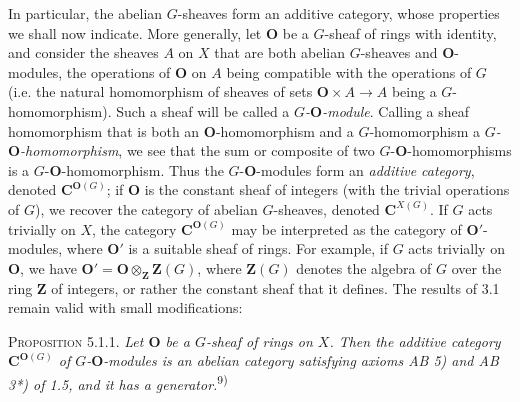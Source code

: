 \clearpage
{}

In particular, the abelian $G$-sheaves form an additive category, whose
properties we shall now indicate.
More generally, let ${\mathbf O}$ be a $G$-sheaf of rings with identity, and consider
the sheaves $A$ on $X$ that are both abelian $G$-sheaves and ${\mathbf O}$-modules, the
operations of ${\mathbf O}$ on $A$ being compatible with the operations of $G$ (i.e.
the natural homomorphism of sheaves of sets
${\mathbf O}\times A\to A$ being a $G$-homomorphism). Such a sheaf will be
called a \textit{$G$-${\mathbf O}$-module}. Calling a sheaf homomorphism that is both an
${\mathbf O}$-homomorphism and a $G$-homomorphism a
\textit{$G$-${\mathbf O}$-homomorphism}, we see that the sum or composite of two
$G$-${\mathbf O}$-homomorphisms is a $G$-${\mathbf O}$-homomorphism.
Thus the $G$-${\mathbf O}$-modules form an \textit{additive category}, denoted
${\mathbf C}^{{\mathbf O}(G)}$; if ${\mathbf O}$ is the constant sheaf of integers (with the trivial
operations of $G$), we recover the category of abelian $G$-sheaves, denoted
${\mathbf C}^{X(G)}$.
If $G$ acts trivially on $X$, the category ${\mathbf C}^{{\mathbf O}(G)}$ may be interpreted as
the category of ${\mathbf O}'$-modules, where ${\mathbf O}'$ is a suitable sheaf of rings. For
example, if $G$ acts trivially on ${\mathbf O}$, we have
${\mathbf O}'={\mathbf O}\otimes_{\mathbf Z}\mathbf Z(G)$, where $\mathbf Z(G)$ denotes the
algebra of $G$ over the ring $\mathbf Z$ of integers, or rather the constant
sheaf that it defines. The results of 3.1 remain valid with small
modifications:

\textsc{Proposition 5.1.1.} \textit{Let ${\mathbf O}$ be a $G$-sheaf of rings
on $X$. Then the additive category ${\mathbf C}^{{\mathbf O}(G)}$ of $G$-${\mathbf O}$-modules is an
abelian category satisfying axioms \textup{AB 5)} and \textup{AB 3*)} of \textup{1.5}, and it has a
generator.}\textsuperscript{9)}


